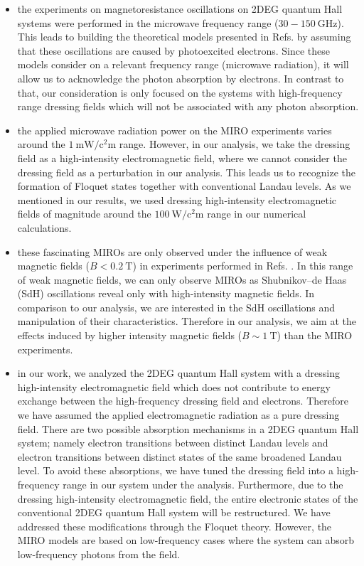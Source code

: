 \documentclass{article}
\begin{document}
\begin{itemize}
  \item
  the experiments on magnetoresistance oscillations on 2DEG quantum Hall systems \cite{zudov01,mani02,zudov03,mani04} were performed in the microwave frequency range ($30 -\SI{150}{\giga\hertz}$). This leads to building the theoretical models presented in Refs. \cite{durst03,dmitriev03} by assuming that these oscillations are caused by photoexcited electrons. Since these models consider on a relevant frequency range (microwave radiation), it will allow us to acknowledge the photon absorption by electrons. In contrast to that, our consideration is only focused on the systems with high-frequency range dressing fields which will not be associated with any photon absorption.
  \item
  the applied microwave radiation power on the MIRO experiments \cite{mani02,zudov03} varies around the  $\SI{1}{\milli\watt\per\square\centi\metre}$ range. However, in our analysis, we take the dressing field as a high-intensity electromagnetic field, where we cannot consider the dressing field as a perturbation in our analysis. This leads us to recognize the formation of Floquet states together with conventional Landau levels. As we mentioned in our results, we used dressing high-intensity electromagnetic fields of magnitude around the $\SI{100}{\watt\per\square\centi\metre}$ range in our numerical calculations.
  \item
  these fascinating MIROs are only observed under the influence of weak magnetic fields ($B < \SI{0.2}{\tesla}$) in experiments performed in Refs. \cite{zudov01,mani02,zudov03,mani04}. In this range of weak magnetic fields,  we can only observe MIROs as Shubnikov–de Haas (SdH) oscillations reveal only with high-intensity magnetic fields. In comparison to our analysis, we are  interested in the SdH oscillations and manipulation of their characteristics. Therefore in our analysis, we aim at the effects induced by higher intensity magnetic fields ($B \sim \SI{1}{\tesla}$) than the MIRO experiments.
  \item
  in our work, we analyzed the 2DEG quantum Hall system with a dressing high-intensity electromagnetic field which does not contribute to energy exchange between the high-frequency dressing field and electrons. Therefore we have assumed the applied electromagnetic radiation as a pure dressing field. There are two possible absorption mechanisms in a 2DEG quantum Hall system; namely electron transitions between distinct Landau levels and electron transitions between distinct states of the same broadened Landau level. To avoid these absorptions, we have tuned the dressing field into a high-frequency range in our system under the analysis. Furthermore, due to the dressing high-intensity electromagnetic field, the entire electronic states of the conventional 2DEG quantum Hall system will be restructured. We have addressed these modifications through the Floquet theory. However, the MIRO models \cite{durst03,dmitriev03} are based on low-frequency cases where the system can absorb low-frequency photons from the field.
\end{itemize}
\end{document}
